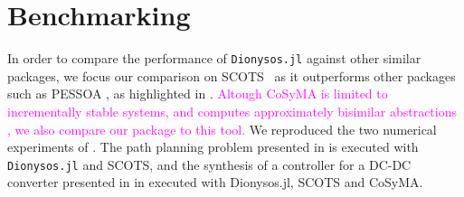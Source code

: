 \documentclass{juliacon}
\begin{document}

\section{Benchmarking}
\label{sec:benchmarks}

In order to compare the performance of \texttt{Dionysos.jl} against other similar packages, we focus our comparison on SCOTS~\cite{rungger2016scots} as it outperforms other packages such as PESSOA \cite{mazo2010pessoa, Roy2011}, as highlighted in \cite{rungger2016scots}. \textcolor{magenta}{Altough CoSyMA is limited to incrementally stable systems, and computes approximately bisimilar abstractions \cite{mouelhi2013cosyma}, we also compare our package to this tool.}
We reproduced the two numerical experiments of \cite{rungger2016scots}. The path planning problem presented in \cite[Section 4.1]{rungger2016scots} is executed with \texttt{Dionysos.jl} and SCOTS, and the synthesis of a controller for a DC-DC converter presented in \cite[Section 4.2]{rungger2016scots} in executed with {Dionysos.jl}, SCOTS and CoSyMA.
\end{document}
